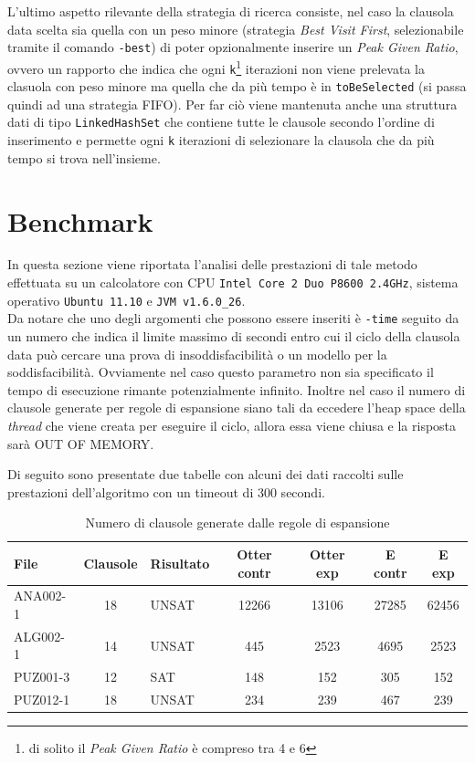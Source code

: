 \documentclass[a4paper,11pt]{article}
\begin{document}
L'ultimo aspetto rilevante della strategia di ricerca consiste, nel caso la clausola data scelta sia quella con un peso minore (strategia \emph{Best Visit First}, selezionabile tramite il comando \texttt{-best}) di poter opzionalmente inserire un \emph{Peak Given Ratio}, ovvero un rapporto che indica che ogni \texttt{k}\footnote{di solito il \emph{Peak Given Ratio} è compreso tra 4 e 6} iterazioni non viene prelevata la clasuola con peso minore ma quella che da più tempo è in \texttt{toBeSelected} (si passa quindi ad una strategia FIFO). Per far ciò viene mantenuta anche una struttura dati di tipo \texttt{LinkedHashSet} che contiene tutte le clausole secondo l'ordine di inserimento e permette ogni \texttt{k} iterazioni di selezionare la clausola che da più tempo si trova nell'insieme.

\section{Benchmark}
In questa sezione viene riportata l'analisi delle prestazioni di tale metodo effettuata su un calcolatore con CPU \texttt{Intel Core 2 Duo P8600 2.4GHz}, sistema operativo \texttt{Ubuntu 11.10} e \texttt{JVM v1.6.0\_26}.\\
Da notare che uno degli argomenti che possono essere inseriti è \texttt{-time} seguito da un numero che indica il limite massimo di secondi entro cui il ciclo della clausola data può cercare una prova di insoddisfacibilità o un modello per la soddisfacibilità. Ovviamente nel caso questo parametro non sia specificato il tempo di esecuzione rimante potenzialmente infinito. Inoltre nel caso il numero di clausole generate per regole di espansione siano tali da eccedere l'heap space della \emph{thread} che viene creata per eseguire il ciclo, allora essa viene chiusa e la risposta sarà OUT OF MEMORY.\par
Di seguito sono presentate due tabelle con alcuni dei dati raccolti sulle prestazioni dell'algoritmo con un timeout di 300 secondi.

\begin{table}[!htp]
\center
\begin{tabular}{lcGcccc}
\toprule
File & Clausole & Risultato & Otter contr & Otter exp &  E contr & E exp \\
\midrule
ANA002-1 & 18 & UNSAT & 12266 & 13106 & 27285 & 62456 \\
ALG002-1 & 14 & UNSAT & 445 & 2523 & 4695 & 2523 \\
PUZ001-3 & 12 & SAT & 148 & 152 & 305 & 152\\
PUZ012-1 & 18 & UNSAT & 234 & 239 & 467 & 239 \\
\bottomrule
\end{tabular}
\caption{Numero di clausole generate dalle regole di espansione}
\end{table}
\end{document}
